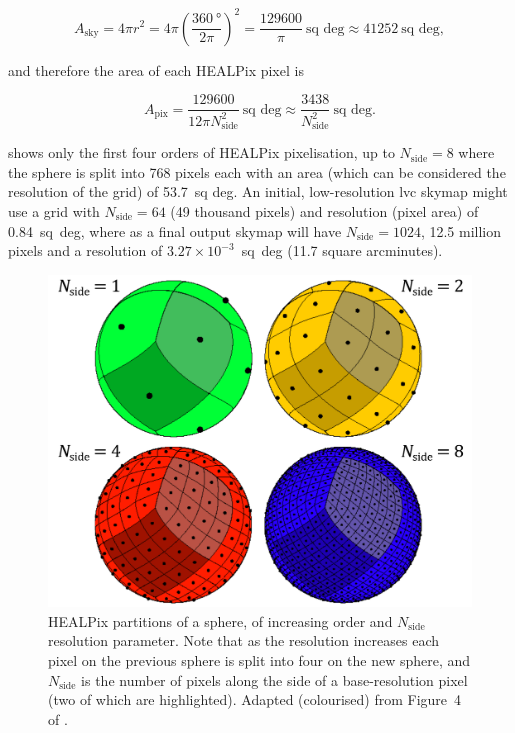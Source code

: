 \begin{colsection}
\begin{colsection}
\begin{equation}
    A_\text{sky} = 4 \pi r^2 = 4 \pi \left ( \frac{\SI{360}{\degree}}{2 \pi} \right )^2 = \frac{129600}{\pi}~\text{sq deg} \approx 41252~\text{sq deg} , %
    \label{eq:sky_area}
\end{equation}

and therefore the area of each HEALPix pixel is

\begin{equation}
    A_\text{pix} = \frac{129600}{12 \pi N_\text{side}^2}~\text{sq~deg} \approx \frac{3438}{N_\text{side}^2}~\text{sq~deg}.
    \label{eq:healpix_area_degrees}
\end{equation}

 shows only the first four orders of HEALPix pixelisation, up to $N_\text{side} = 8$ where the sphere is split into 768 pixels each with an area (which can be considered the resolution of the grid) of 53.7~sq deg. An initial, low-resolution \gls{lvc} skymap might use a grid with $N_\text{side} = 64$ (49 thousand pixels) and resolution (pixel area) of 0.84~sq~deg, where as a final output skymap will have $N_\text{side} = 1024$, 12.5 million pixels and a resolution of $3.27 \times 10^{-3}$~sq~deg (11.7 square arcminutes).

\begin{figure}[t]
    \begin{center}
        \includegraphics[width=0.7\linewidth]{images/healpix.pdf}
    \end{center}
    \caption[HEALPix partitions of a sphere]{
        HEALPix partitions of a sphere, of increasing order and $N_\text{side}$ resolution parameter. Note that as the resolution increases each pixel on the previous sphere is split into four on the new sphere, and $N_\text{side}$ is the number of pixels along the side of a base-resolution pixel (two of which are highlighted). Adapted (colourised) from Figure~4 of \citet{HEALPix}.
    }\label{fig:healpix}
\end{figure}


\end{colsection}
\end{colsection}
